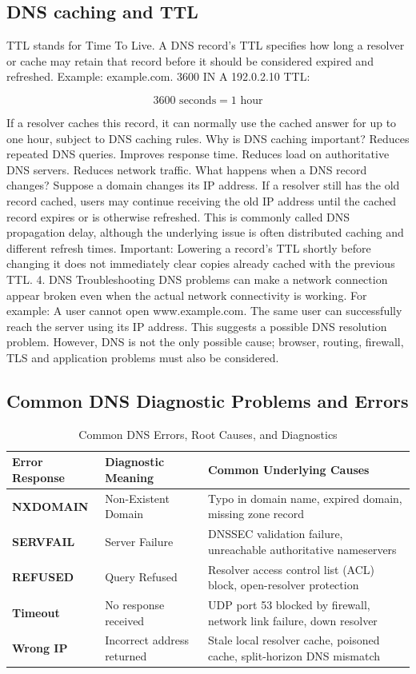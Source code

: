 \subsection{DNS caching and TTL}
TTL stands for Time To Live.
A DNS record's TTL specifies how long a resolver or cache may retain that record before it should be considered expired and refreshed.
Example:
example.com. 3600 IN A 192.0.2.10
TTL:

\[
3600\text{ seconds}=1\text{ hour}
\]

If a resolver caches this record, it can normally use the cached answer for up to one hour, subject to DNS caching rules.
Why is DNS caching important?
Reduces repeated DNS queries.
Improves response time.
Reduces load on authoritative DNS servers.
Reduces network traffic.
What happens when a DNS record changes?
Suppose a domain changes its IP address.
If a resolver still has the old record cached, users may continue receiving the old IP address until the cached record expires or is otherwise refreshed.
This is commonly called DNS propagation delay, although the underlying issue is often distributed caching and different refresh times.
Important: Lowering a record's TTL shortly before changing it does not immediately clear copies already cached with the previous TTL.
4. DNS Troubleshooting
DNS problems can make a network connection appear broken even when the actual network connectivity is working.
For example:
A user cannot open www.example.com.
The same user can successfully reach the server using its IP address.
This suggests a possible DNS resolution problem.
However, DNS is not the only possible cause; browser, routing, firewall, TLS and application problems must also be considered.
\subsection{Common DNS Diagnostic Problems and Errors}
\begin{table}[htbp]
\centering
\caption{Common DNS Errors, Root Causes, and Diagnostics}
\label{tab:dns_errors_diagnostics}
\begin{tabularx}{\textwidth}{p{2.8cm} p{4.5cm} X}
\toprule
\textbf{Error Response} & \textbf{Diagnostic Meaning} & \textbf{Common Underlying Causes} \\
\midrule
\textbf{NXDOMAIN} & Non-Existent Domain & Typo in domain name, expired domain, missing zone record \\
\textbf{SERVFAIL} & Server Failure & DNSSEC validation failure, unreachable authoritative nameservers \\
\textbf{REFUSED} & Query Refused & Resolver access control list (ACL) block, open-resolver protection \\
\textbf{Timeout} & No response received & UDP port 53 blocked by firewall, network link failure, down resolver \\
\textbf{Wrong IP} & Incorrect address returned & Stale local resolver cache, poisoned cache, split-horizon DNS mismatch \\
\bottomrule
\end{tabularx}
\end{table}
